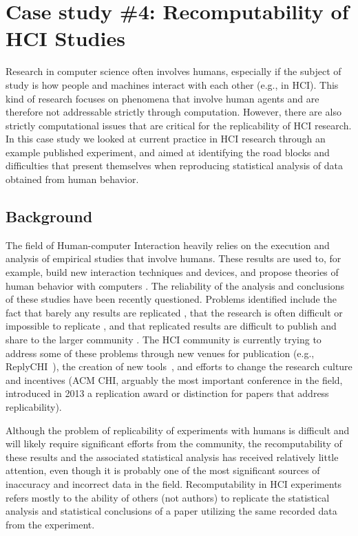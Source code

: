 \section{Case study \#4: Recomputability of HCI Studies}
\label{s:group4}

Research in computer science often involves humans, especially if the subject of study is how people and machines interact with each other (e.g., in HCI). This kind of research focuses on phenomena that involve human agents and are therefore not addressable strictly through computation. However, there are also strictly computational issues that are critical for the replicability of HCI research. In this case study we looked at current practice in HCI research through an example published experiment, and aimed at identifying the road blocks and difficulties that present themselves when reproducing statistical analysis of data obtained from human behavior.  

\subsection{Background}
The field of Human-computer Interaction heavily relies on the execution and analysis of empirical studies that involve humans. These results are used to, for example, build new interaction techniques and devices\cite{}, and propose theories of human behavior with computers \cite{}. The reliability of the analysis and conclusions of these studies have been recently questioned. Problems identified include the fact that barely any results are replicated \cite{hornbaek}, that the research is often difficult or impossible to replicate \cite{wilson1}, and that replicated results are difficult to publish and share to the larger community \cite{}. The HCI community is currently trying to address some of these problems through new venues for publication (e.g., ReplyCHI~\cite{replichiVenue}), the creation of new tools~\cite{mackay}, and efforts to change the research culture and incentives (ACM CHI, arguably the most important conference in the field, introduced in 2013 a replication award or distinction for papers that address replicability).

Although the problem of replicability of experiments with humans is difficult and will likely require significant efforts from the community, the recomputability of these results and the associated statistical analysis has received relatively little attention, even though it is probably one of the most significant sources of inaccuracy and incorrect data in the field. Recomputability in HCI experiments refers mostly to the ability of others (not authors) to replicate the statistical analysis and statistical conclusions of a paper utilizing the same recorded data from the experiment. 

